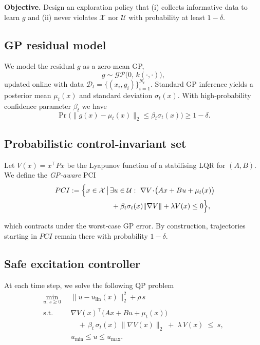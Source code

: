 \documentclass[10pt]{article}
\newcommand{\1}{\mathbbm{1}}
\begin{document}
\textbf{Objective.} Design an exploration policy that (i) collects informative data to learn $g$ and (ii) never violates $\mathcal X$ nor $\mathcal U$ with probability at least $1-\delta$.

\subsection{GP residual model}
We model the residual $g$ as a zero‑mean GP,
\begin{equation}
  g \sim \mathcal{GP}\bigl(0,\,k(\cdot,\cdot)\bigr),
\end{equation}
updated online with data $\mathcal D_t=\{(x_i,g_i)\}_{i=1}^{N_t}$.  Standard GP inference yields a posterior mean $\mu_t(x)$ and standard deviation $\sigma_t(x)$. With high‑probability confidence parameter $\beta_t$ we have
\begin{equation}\label{eq:gp_conf}
  \Pr\bigl(\|g(x)-\mu_t(x)\|_2 \le \beta_t\sigma_t(x)\bigr) \ge 1-\delta.\!
\end{equation}

\subsection{Probabilistic control‑invariant set}
Let $V(x)=x^\top P x$ be the Lyapunov function of a stabilising LQR for $(A,B)$.  We define the \emph{GP‑aware} PCI
\begin{align}\label{eq:PCI}
  \ PCI &:= \Bigl\{x\in\mathcal X\,\big|\, \exists u\in\mathcal U:\ 
    \nabla V\!\cdot\!\bigl(Ax+Bu+\mu_t(x)\bigr) \\
    &\hphantom{:= \Bigl\{x\in\mathcal X\,}\quad+\beta_t\sigma_t(x)\|\nabla V\| + \lambda V(x) \le 0 \Bigr\},
\end{align}



which contracts under the worst‑case GP error.  By construction, trajectories starting in $PCI$ remain there with probability $1-\delta$.

\subsection{Safe excitation controller}
At each time step, we solve the following QP problem
\begin{equation}\label{eq:QP}
\begin{aligned}
\min_{u,\,s\ge 0}\;\; & \|u-u_{\mathrm{lin}}(x)\|_2^2 + \rho\, s \\
\text{s.t.}\;\; 
& \nabla V(x)^\top\!\big(Ax + Bu + \mu_t(x)\big) \\
&\quad +\, \beta_t\,\sigma_t(x)\,\|\nabla V(x)\|_2 \;+\; \lambda\,V(x) \;\le\; s,\\
& u_{\min} \le u \le u_{\max}.
\end{aligned}
\end{equation}
\end{document}
